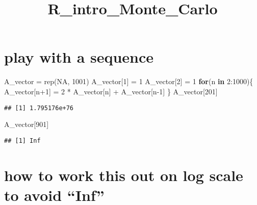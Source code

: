 \documentclass[
]{article}
\title{R\_intro\_Monte\_Carlo}
\author{}
\date{\vspace{-2.5em}}
\newenvironment{Shaded}{\begin{snugshade}}{\end{snugshade}}
\newcommand{\ConstantTok}[1]{\textcolor[rgb]{0.00,0.00,0.00}{#1}}
\newcommand{\ControlFlowTok}[1]{\textcolor[rgb]{0.13,0.29,0.53}{\textbf{#1}}}
\newcommand{\DecValTok}[1]{\textcolor[rgb]{0.00,0.00,0.81}{#1}}
\newcommand{\FunctionTok}[1]{\textcolor[rgb]{0.00,0.00,0.00}{#1}}
\newcommand{\NormalTok}[1]{#1}
\newcommand{\OtherTok}[1]{\textcolor[rgb]{0.56,0.35,0.01}{#1}}
\newcommand{\SpecialCharTok}[1]{\textcolor[rgb]{0.00,0.00,0.00}{#1}}
\begin{document}
\maketitle

\hypertarget{play-with-a-sequence}{%
\section{play with a sequence}\label{play-with-a-sequence}}

\begin{Shaded}
\begin{Highlighting}[]
\NormalTok{A\_vector }\OtherTok{=} \FunctionTok{rep}\NormalTok{(}\ConstantTok{NA}\NormalTok{, }\DecValTok{1001}\NormalTok{)}
\NormalTok{A\_vector[}\DecValTok{1}\NormalTok{] }\OtherTok{=} \DecValTok{1}
\NormalTok{A\_vector[}\DecValTok{2}\NormalTok{] }\OtherTok{=} \DecValTok{1}
\ControlFlowTok{for}\NormalTok{(n }\ControlFlowTok{in} \DecValTok{2}\SpecialCharTok{:}\DecValTok{1000}\NormalTok{)\{}
\NormalTok{  A\_vector[n}\SpecialCharTok{+}\DecValTok{1}\NormalTok{] }\OtherTok{=} \DecValTok{2} \SpecialCharTok{*}\NormalTok{ A\_vector[n] }\SpecialCharTok{+}\NormalTok{ A\_vector[n}\DecValTok{{-}1}\NormalTok{]}
\NormalTok{\}}
\NormalTok{A\_vector[}\DecValTok{201}\NormalTok{]}
\end{Highlighting}
\end{Shaded}

\begin{verbatim}
## [1] 1.795176e+76
\end{verbatim}

\begin{Shaded}
\begin{Highlighting}[]
\NormalTok{A\_vector[}\DecValTok{901}\NormalTok{]}
\end{Highlighting}
\end{Shaded}

\begin{verbatim}
## [1] Inf
\end{verbatim}

\hypertarget{how-to-work-this-out-on-log-scale-to-avoid-inf}{%
\section{how to work this out on log scale to avoid
``Inf''}\label{how-to-work-this-out-on-log-scale-to-avoid-inf}}
\end{document}
